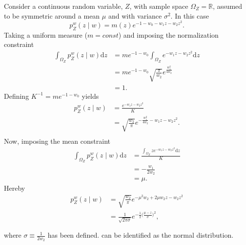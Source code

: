 \begin{example}
	Consider a continuous random variable, $Z$, with sample space $\Omega_Z=\mathbb{R}$, assumed to be symmetric around a mean $\mu$ and with variance $\sigma^2$. In this case
	\begin{equation}
			p_{Z}^w(z \mid w)= m(z) e^{-1 - w_0 - w_1z-w_2z^2}.
	\end{equation}
	Taking a uniform measure ($m= const$) and imposing the normalization constraint
	\begin{equation}
		\begin{split}
			\int_{\Omega_Z} p_{Z}^w(z\mid w) \mathrm{d}z &= me^{-1-w_0}\int_{\Omega_Z} e^{-w_1z-w_2z^2} \mathrm{d}z\\
			&= me^{-1-w_0}\sqrt{\frac{\pi}{w_2}}e^{\frac{w_1^2}{4w_2}}\\
			&=1.
		\end{split}
	\end{equation}
	Defining $K^{-1} = me^{-1-w_0}$ yields
	\begin{equation}
		\begin{split}
			p_{Z}^w(z \mid w) &= \frac{e^{-w_1z-w_2z^2}}{K}\\
			&= \sqrt{\frac{w_2}{\pi}}e^{-\frac{w_1^2}{4w_2}-w_1z-w_2z^2}.\\
		\end{split}
	\end{equation}
	Now, imposing the mean constraint
	\begin{equation}
		\begin{split}
			\int_{\Omega_Z} p_{Z}^w(z\mid w) \mathrm{d}z &= \frac{\int_{\Omega_Z} ze^{-w_1z-w_2z^2}\mathrm{d}z}{K}\\
			&= -\frac{w_1}{2w_2}\\
			&=\mu.
		\end{split}
	\end{equation}
	Hereby
	\begin{equation}
		\begin{split}
			p_{Z}^w(z\mid w) &= \sqrt{\frac{w_2}{\pi}}e^{-\mu^2w_2+2\mu w_2z-w_2z^2}\\
			&= \frac{1}{\sqrt{2\pi\sigma}}e^{-\frac{1}{2}\big(\frac{\mu-z}{\sigma}\big)^2},\\\\
		\end{split}
		\label{eq:norm1}
	\end{equation}
	where $\sigma\equiv \frac{1}{2w_2}$ has been defined.  can be identified as the normal distribution.
\end{example}

